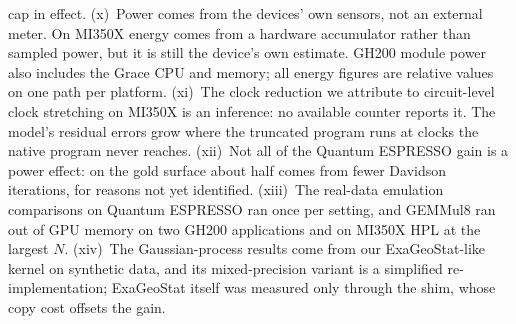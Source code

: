 \documentclass[conference]{IEEEtran}
\begin{document}
cap in effect. (x)~Power comes from the devices' own sensors, not an external meter. On MI350X energy comes from a
hardware accumulator rather than sampled power, but it is still the device's own estimate. GH200 module power also
includes the Grace CPU and memory; all energy figures are relative values on one path per platform. (xi)~The
clock reduction we attribute to circuit-level clock stretching on MI350X is an inference: no available counter reports
it. The model's residual errors grow where the truncated program runs at clocks the native program never reaches.
(xii)~Not all of the Quantum ESPRESSO gain is a power effect: on the gold surface about half comes from fewer Davidson
iterations, for reasons not yet identified. (xiii)~The real-data emulation comparisons on Quantum ESPRESSO ran once per
setting, and GEMMul8 ran out of GPU memory on two GH200 applications and on MI350X HPL at the largest $N$. (xiv)~The
Gaussian-process results come from our ExaGeoStat-like kernel on synthetic data, and its mixed-precision variant is a
simplified re-implementation; ExaGeoStat itself was measured only through the shim, whose copy cost offsets the gain.
\end{document}
